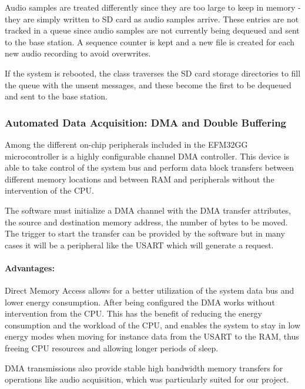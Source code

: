Audio samples are treated differently since they are too large to keep in memory - they are simply written to SD card as audio samples arrive. These entries are not tracked in a queue since audio samples are not currently being dequeued and sent to the base station. A sequence counter is kept and a new file is created for each new audio recording to avoid overwrites.

If the system is rebooted, the class traverses the SD card storage directories to fill the queue with the unsent messages, and these become the first to be dequeued and sent to the base station.


\subsubsection{Automated Data Acquisition: DMA and Double Buffering}
\label{sec:dma}
Among the different on-chip peripherals included in the EFM32GG microcontroller is a highly configurable channel DMA controller. This device is able to take control of the system bus and perform data block transfers between different memory locations and between RAM and peripherals without the intervention of the CPU.

The software must initialize a DMA channel with the DMA transfer attributes, the source and destination memory address, the number of bytes to be moved. The trigger to start the transfer can be provided by the software but in many cases it will be a peripheral like the USART which will generate a request.
 

\paragraph{Advantages:}
Direct Memory Access allows for a better utilization of the system data bus and lower energy consumption. After being configured the DMA works without intervention from the CPU. This has the benefit of reducing the energy consumption and the workload of the CPU, and enables the system to stay in low energy modes when moving for instance data from the USART to the RAM, thus freeing CPU resources and allowing longer periods of sleep.

DMA transmissions also provide stable high bandwidth memory transfers for operations like audio acquisition, which was particularly suited for our project.

